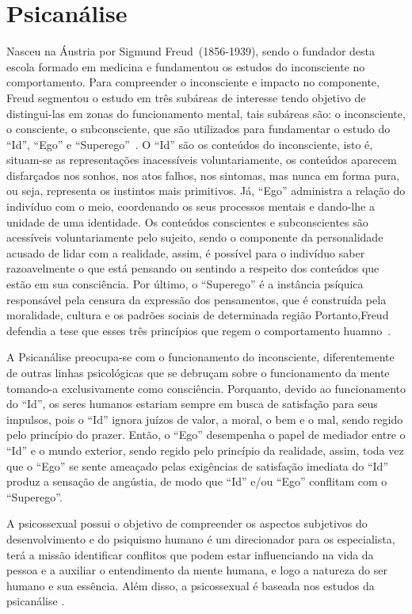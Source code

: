 \section{Psicanálise}\label{psicanalise}

Nasceu na Áustria por Sigmund Freud~(1856-1939), sendo o fundador desta escola formado em medicina e fundamentou os estudos do inconsciente no comportamento.
Para compreender o inconsciente e impacto no componente, Freud segmentou o estudo em três subáreas de interesse tendo objetivo de distingui-las em zonas do funcionamento mental, tais subáreas são: o inconsciente, o consciente, o subconsciente, que são utilizados para fundamentar o estudo do ``Id'', ``Ego'' e ``Superego''~\cite{hothersall1997historia}. 
O ``Id'' são os conteúdos do inconsciente, isto é, situam-se as representações inacessíveis voluntariamente, os conteúdos aparecem disfarçados nos sonhos, nos atos falhos, nos sintomas, mas nunca em forma pura, ou seja, representa os instintos mais primitivos. 
Já, ``Ego'' administra a relação do indivíduo com o meio, coordenando os seus processos mentais e dando-lhe a unidade de uma identidade. 
Os conteúdos conscientes e subconscientes são acessíveis voluntariamente pelo sujeito, sendo o componente da personalidade acusado de lidar com a realidade, assim, é possível para o indivíduo saber razoavelmente o que está pensando ou sentindo a respeito dos conteúdos que estão em sua consciência.
Por último, o ``Superego'' é a instância psíquica responsável pela censura da expressão dos pensamentos, que é construída pela moralidade, cultura e os padrões sociais de determinada região
Portanto,Freud defendia a tese que esses três princípios que regem o comportamento huamno~\cite{silva2007psicologia_educacao}.

A Psicanálise preocupa-se com o funcionamento do inconsciente, diferentemente de outras linhas psicológicas que se debruçam sobre o funcionamento da mente tomando-a exclusivamente como consciência.
Porquanto, devido ao funcionamento do ``Id'', os seres humanos estariam sempre em busca de satisfação para seus impulsos, pois o ``Id'' ignora juízos de valor, a moral, o bem e o mal, sendo regido pelo princípio do prazer.
Então, o ``Ego'' desempenha o papel de mediador entre o ``Id'' e o mundo exterior, sendo regido pelo
princípio da realidade, assim, toda vez que o ``Ego'' se sente ameaçado pelas exigências de satisfação
imediata do ``Id'' produz a sensação de angústia, de modo que  ``Id'' e/ou ``Ego'' conflitam com o ``Superego''.

A psicossexual possui o objetivo de compreender os aspectos subjetivos do desenvolvimento e do psiquismo humano é um direcionador para os especialista, terá a missão identificar conflitos que podem estar influenciando na vida da pessoa e a auxiliar o entendimento da mente humana, e logo a natureza do ser humano e sua essência.
Além disso, a psicossexual é baseada nos estudos da psicanálise \cite{silva2007psicologia_educacao}. 


